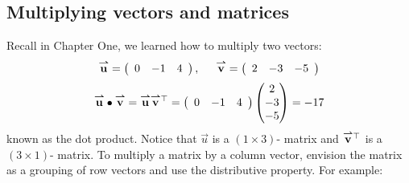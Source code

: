 \documentclass{ximera}
\begin{document}
\subsection{Multiplying vectors and matrices}
Recall in Chapter One, we learned how to multiply two vectors:
\[\vec{u}= \left(\begin{array}{ccc}
0 & -1 & 4
\end{array}\right), \hspace{.5cm} \vec{v} = \left(\begin{array}{ccc}
2 & -3 & -5
\end{array}\right)
\]
\[
\vec{u}\dotp \vec{v} = \vec{u} \vec{v}^{\transpose} = \left(\begin{array}{ccc}
0 & -1 & 4
\end{array}\right)
\begin{pmatrix}
2\\
-3\\
-5
\end{pmatrix}
= -17
\]
known as the dot product. Notice that $\vec{u}$ is a $\left(1\times 3\right)$- matrix and $\vec{v}^{\transpose}$ is a $\left(3\times 1\right)$- matrix. To multiply a matrix by a column vector, envision the matrix as a
grouping of row vectors and use the distributive property. For
example:
\end{document}
